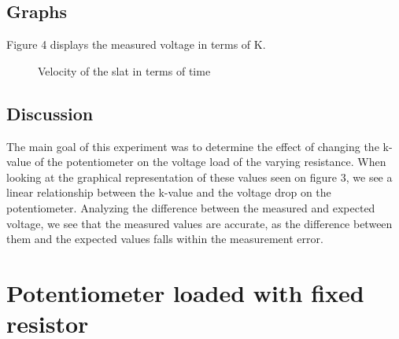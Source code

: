 \documentclass[a4paper]{article}
\newcommand{\unit}[1]{~\mathrm{#1}}
\begin{document}
\subsection{Graphs}
Figure 4 displays the measured voltage in terms of K.
\begin{figure}[!ht]
    \centering
    \caption{Velocity of the slat in terms of time}
    \label{fig:3}
\end{figure}
\subsection{Discussion}
The main goal of this experiment was to determine the effect of changing the
k-value of the potentiometer on the voltage load of the varying resistance. When
looking at the graphical representation of these values seen on figure 3, we see
a linear relationship between the k-value and the voltage drop on the
potentiometer. Analyzing the difference between the measured and expected
voltage, we see that the measured values are accurate, as the difference between
them and the expected values falls within the measurement error. 
\newpage
\section{Potentiometer loaded with fixed resistor}
\end{document}
